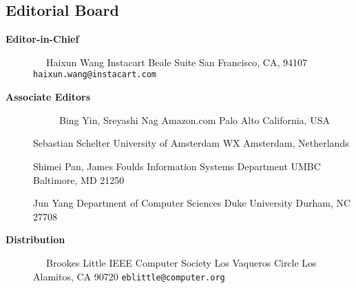 \documentclass[10pt,twocolumn]{article}
\begin{document}
\pagestyle{empty}

\subsection*{Editorial Board}

\begin{description}
\item[{\bf Editor-in-Chief}]
\verb-  -                      \newline
Haixun Wang                 \newline
Instacart              Beale Suite\newline
San Francisco, CA, 94107\newline
\verb+haixun.wang@instacart.com+     \newline
\vspace{-.2cm}

\item[{\bf Associate Editors}] 
\verb-  -                     \newline
\verb-  -                     \newline
Bing Yin, Sreyashi Nag\newline
Amazon.com\newline
Palo Alto\newline
California, USA\newline

\vspace{-.4cm}
Sebastian Schelter\newline
University of Amsterdam WX Amsterdam, Netherlands\newline

\vspace{-.4cm}
Shimei Pan, James Foulds\newline
Information Systems Department\newline 
UMBC\newline
Baltimore, MD 21250\newline

\vspace{-.4cm}
Jun Yang\newline
Department of Computer Sciences \newline 
Duke University\newline
Durham, NC 27708\newline
\vspace{-.4cm}

\item[{\bf Distribution}]      
\verb-  -                      \newline
Brookes Little           \newline
IEEE Computer Society           Los Vaqueros Circle       \newline
Los Alamitos, CA 90720     \newline
\verb+eblittle@computer.org+     \newline
\vspace{-.4cm}		            
\end{description}
\end{document}
